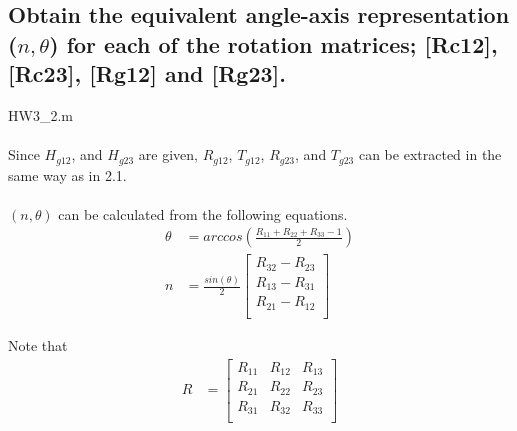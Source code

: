 \documentclass[]{article}
\begin{document}
\newpage
\subsection{Obtain the equivalent angle-axis representation ($n, \theta$) for each of the rotation matrices; [Rc12], [Rc23], [Rg12] and [Rg23].}
HW3\_2.m\\
\\
\indent Since $H_{g12}$, and $H_{g23}$ are given, $R_{g12}$, $T_{g12}$, $R_{g23}$, and $T_{g23}$ can be extracted in the same way as in 2.1.\\
\\
\indent $(n, \theta)$ can be calculated from the following equations.
\begin{align*}
\theta &= arccos
\left(
\frac{R_{11}+R_{22}+R_{33}-1}{2}
\right)\\
n &= \frac{sin(\theta)}{2}
\begin{bmatrix}
R_{32}-R_{23}\\
R_{13}-R_{31}\\
R_{21}-R_{12}\\
\end{bmatrix}
\end{align*}

\indent Note that
\begin{align*}
R &= 
\begin{bmatrix}
R_{11} & R_{12} & R_{13} \\
R_{21} & R_{22} & R_{23} \\
R_{31} & R_{32} & R_{33} \\
\end{bmatrix}
\end{align*}
\end{document}
